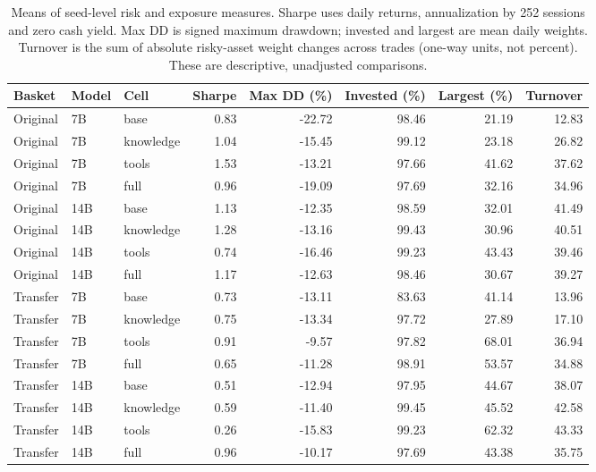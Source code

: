 \begin{table}[t]
\centering\small
\setlength{\tabcolsep}{4pt}
\begin{tabular}{lllrrrrr}
\toprule
Basket & Model & Cell & Sharpe & Max DD (\%) & Invested (\%) & Largest (\%) & Turnover \\
\midrule
Original & 7B & base & 0.83 & -22.72 & 98.46 & 21.19 & 12.83 \\
Original & 7B & knowledge & 1.04 & -15.45 & 99.12 & 23.18 & 26.82 \\
Original & 7B & tools & 1.53 & -13.21 & 97.66 & 41.62 & 37.62 \\
Original & 7B & full & 0.96 & -19.09 & 97.69 & 32.16 & 34.96 \\
Original & 14B & base & 1.13 & -12.35 & 98.59 & 32.01 & 41.49 \\
Original & 14B & knowledge & 1.28 & -13.16 & 99.43 & 30.96 & 40.51 \\
Original & 14B & tools & 0.74 & -16.46 & 99.23 & 43.43 & 39.46 \\
Original & 14B & full & 1.17 & -12.63 & 98.46 & 30.67 & 39.27 \\
Transfer & 7B & base & 0.73 & -13.11 & 83.63 & 41.14 & 13.96 \\
Transfer & 7B & knowledge & 0.75 & -13.34 & 97.72 & 27.89 & 17.10 \\
Transfer & 7B & tools & 0.91 & -9.57 & 97.82 & 68.01 & 36.94 \\
Transfer & 7B & full & 0.65 & -11.28 & 98.91 & 53.57 & 34.88 \\
Transfer & 14B & base & 0.51 & -12.94 & 97.95 & 44.67 & 38.07 \\
Transfer & 14B & knowledge & 0.59 & -11.40 & 99.45 & 45.52 & 42.58 \\
Transfer & 14B & tools & 0.26 & -15.83 & 99.23 & 62.32 & 43.33 \\
Transfer & 14B & full & 0.96 & -10.17 & 97.69 & 43.38 & 35.75 \\
\bottomrule
\end{tabular}
\caption{Means of seed-level risk and exposure measures. Sharpe uses daily returns, annualization by 252 sessions and zero cash yield. Max DD is signed maximum drawdown; invested and largest are mean daily weights. Turnover is the sum of absolute risky-asset weight changes across trades (one-way units, not percent). These are descriptive, unadjusted comparisons.}
\label{tab:factorial-risk}
\end{table}
